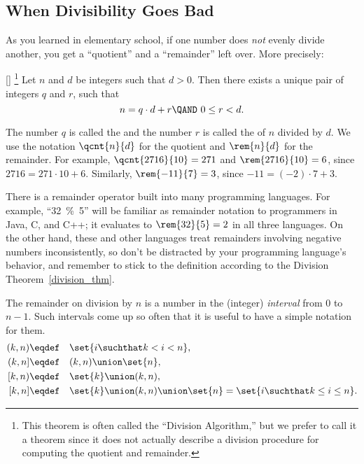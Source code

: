 \subsection{When Divisibility Goes Bad}

As you learned in elementary school, if one number does \emph{not}
evenly divide another, you get a ``quotient'' and a ``remainder'' left
over.  More precisely:
\begin{theorem}\label{division_thm}[]%
\footnote{This theorem is often called the ``Division Algorithm,'' but
  we prefer to call it a theorem since it does not actually describe
  a division procedure for computing the quotient and remainder.}  Let
$n$ and $d$ be integers such that $d > 0$.  Then there exists a unique
pair of integers $q$ and $r$, such that
\begin{equation}\label{nqdr}
n = q \cdot d + r \QAND\ 0 \leq r < d.
\end{equation}
\end{theorem}
The number $q$ is called the  and the number $r$ is
called the  of $n$ divided by $d$.  We use the
notation $\qcnt{n}{d}$ for the quotient and $\rem{n}{d}$ for the
remainder. For example, $\qcnt{2716}{10} = 271$ and $\rem{2716}{10} =
6$, since $2716 = 271 \cdot 10 + 6$.  Similarly, $\rem{-11}{7} = 3$,
since $-11 = (-2) \cdot 7 + 3$.

There is a remainder operator built into many programming languages.
For example, ``32~\%~5'' will be familiar as remainder notation to
programmers in Java, C, and C++; it evaluates to $\rem{32}{5} =2$ in
all three languages.  On the other hand, these and other languages treat
remainders involving negative numbers inconsistently, so don't be
distracted by your programming language's behavior, and remember to
stick to the definition according to the Division
Theorem~\ref{division_thm}.

The remainder on division by $n$ is a number in the (integer)
\emph{interval} from 0 to $n-1$.  Such intervals come up so often that
it is useful to have a simple notation for them.
\begin{align*}
(k, n) & \eqdef\quad \set{i \suchthat k < i < n},\\
(k, n] & \eqdef\quad (k,n) \union \set{n},\\
[k, n) & \eqdef\quad \set{k} \union (k,n),\\
[k,n] & \eqdef\quad \set{k} \union (k,n) \union \set{n} = \set{i \suchthat k \leq i \leq n}.
\end{align*}

